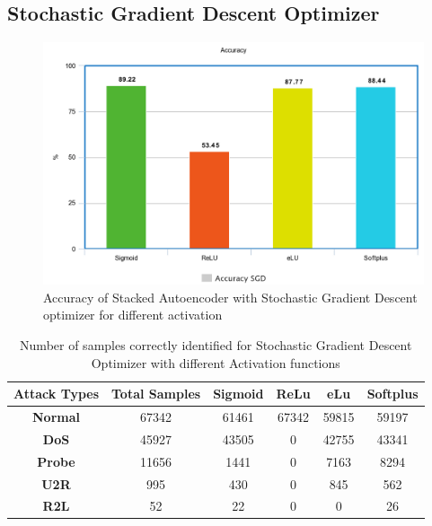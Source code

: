 \documentclass[12pt, a4paper]{report}
\begin{document}
\begin{appendices}
	\section {Stochastic Gradient Descent Optimizer}
	 \begin{figure}[ht]
\centering
\captionsetup{justification=centering,margin=2cm}
\includegraphics[width=13cm]{accuracy_sgd_tflearn.png}
\caption{ Accuracy of Stacked Autoencoder with Stochastic Gradient Descent optimizer for different activation }
\label{fig:acc_sgd}
\end{figure}
\begin{table}[h]
\centering
\captionsetup{justification=centering,margin=2cm}
\begin{tabular}{|c|c|c|c|c|c|}
\hline
\textbf{Attack Types} & \textbf{Total Samples} & \textbf{Sigmoid} & \textbf{ReLu} & \textbf{eLu} & \textbf{Softplus} \\ \hline
\textbf{Normal}       & 67342                  & 61461            & 67342         & 59815        & 59197             \\ \hline
\textbf{DoS}          & 45927                  & 43505            & 0         & 42755        & 43341             \\ \hline
\textbf{Probe}        & 11656                  & 1441             & 0          & 7163         & 8294              \\ \hline
\textbf{U2R}          & 995                    & 430              & 0           & 845          & 562               \\ \hline
\textbf{R2L}          & 52                     & 22               & 0            & 0           & 26                \\ \hline
\end{tabular}
\caption{Number of samples correctly identified for Stochastic Gradient Descent Optimizer with different Activation functions}
\label{confusion_sgd}
\end{table}
\clearpage

\end{appendices}
\end{document}
